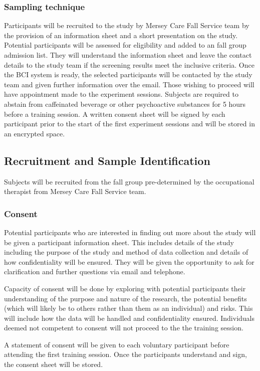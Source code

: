 \documentclass{article}
\begin{document}
\subsubsection{Sampling technique}
Participants will be recruited to the study by Mersey Care Fall Service team by the provision of an information sheet and a short presentation on the study. Potential participants will be assessed for eligibility and added to an fall group admission list. They will understand the information sheet and leave the contact details to the study team if the screening results meet the inclusive criteria. Once the BCI system is ready, the selected participants will be contacted by the study team and given further information over the email. Those wishing to proceed will have appointment made to the experiment sessions. Subjects are required to abstain from caffeinated beverage or other psychoactive
substances for 5 hours before a training session. A written consent sheet will be signed by each participant prior to the start of the first experiment sessions and will be stored in an encrypted space. 

\subsection{Recruitment and Sample Identification}
Subjects will be recruited from the fall group pre-determined by the occupational therapist from Mersey Care Fall Service team.

\subsubsection{Consent}
Potential participants who are interested in finding out more about the study will be given a participant information sheet. This includes details of the study including the purpose of the study and method of data collection and details of how confidentiality will be ensured. They will be given the opportunity to ask for clarification and further questions via email and telephone.

Capacity of consent will be done by exploring with potential participants their understanding of the purpose and nature of the research, the potential benefits (which will likely be to others rather than them as an individual) and risks. This will include how the data will be handled and confidentiality ensured. Individuals deemed not competent to consent will not proceed to the the training session.

A statement of consent will be given to each voluntary participant before attending the first training session. Once the participants understand and sign, the consent sheet will be stored.
\end{document}
